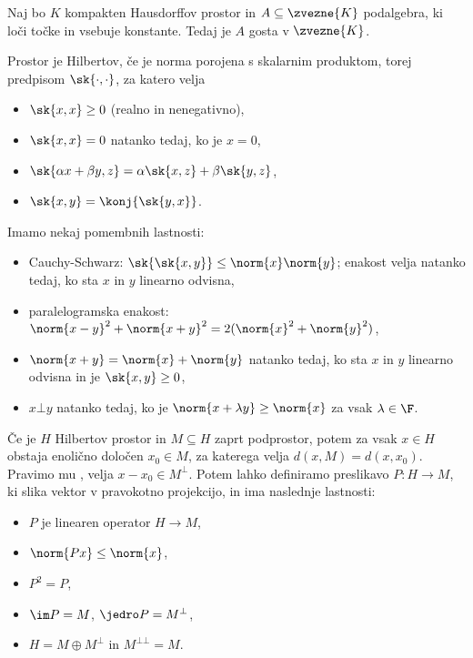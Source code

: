 \begin{izrek}
  Naj bo $K$ kompakten Hausdorffov prostor in $A \subseteq \zvezne{K}$
  podalgebra, ki loči točke in vsebuje konstante.
  Tedaj je $A$ gosta v $\zvezne{K}$.
\end{izrek}


Prostor je Hilbertov, če je norma porojena s skalarnim produktom, torej
predpisom $\sk{\cdot, \cdot}$, za katero velja
\begin{itemize}
\item $\sk{x,x} \ge 0$ (realno in nenegativno),
\item $\sk{x,x} = 0$ natanko tedaj, ko je $x = 0$,
\item $\sk{\alpha x + \beta y, z} = \alpha \sk{x,z} + \beta \sk{y,z}$,
\item $\sk{x,y} = \konj{\sk{y,x}}$.
\end{itemize}
Imamo nekaj pomembnih lastnosti:
\begin{itemize}
\item Cauchy-Schwarz: $\sk{\sk{x,y}} \le \norm{x} \norm{y}$;
  enakost velja natanko tedaj, ko sta $x$ in $y$ linearno odvisna,
\item paralelogramska enakost: $\norm{x-y}^2 + \norm{x+y}^2 = 2 (\norm{x}^2 +
  \norm{y}^2)$,
\item $\norm{x+y} = \norm{x} + \norm{y}$ natanko tedaj, ko sta $x$ in $y$
  linearno odvisna in je $\sk{x,y} \ge 0$,
\item $x \bot y$ natanko tedaj, ko je $\norm{x+\lambda y} \ge \norm{x}$ za vsak
  $\lambda \in \F$.
\end{itemize}

Če je $H$ Hilbertov prostor in $M \subseteq H$ zaprt podprostor, potem za vsak
$x \in H$ obstaja enolično določen $x_0 \in M$, za katerega velja $d(x,M) = d(x,
x_0)$.
Pravimo mu , velja $x - x_0 \in M^\bot$.
Potem lahko definiramo preslikavo $P: H \to M$, ki slika vektor v pravokotno
projekcijo, in ima naslednje lastnosti:
\begin{itemize}
\item $P$ je linearen operator $H \to M$,
\item $\norm{Px} \le \norm{x}$,
\item $P^2 = P$,
\item $\im P = M$, $\jedro P = M^\bot$,
\item $H = M \oplus M^\bot$ in $M^{\bot \bot} = M$.
\end{itemize}

